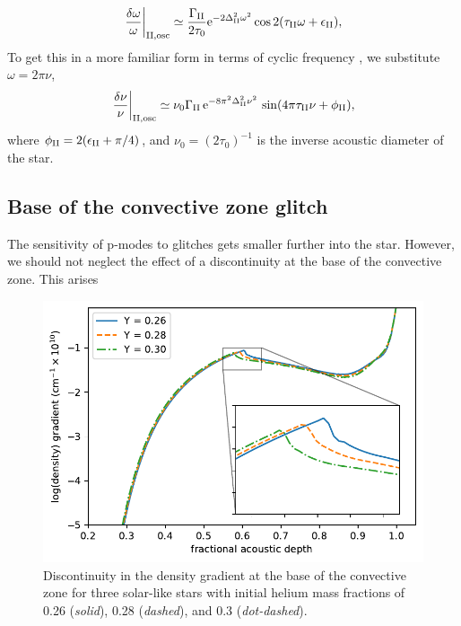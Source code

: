 %
\begin{equation}
    \left.\frac{\delta\omega}{\omega}\right|_{{\mathrm{II}}, \mathrm{osc}} \simeq \frac{\Gamma_{{\mathrm{II}}}}{2 \tau_0} \mathrm{e}^{- 2 \Delta_{{\mathrm{II}}}^2 \omega^2} \cos 2 (\tau_{{\mathrm{II}}}\omega + \epsilon_{{\mathrm{II}}}),
\end{equation}
%
To get this in a more familiar form in terms of cyclic frequency \citep[e.g.][]{Verma.Faria.ea2014,Verma.Raodeo.ea2017}, we substitute \(\omega = 2\pi\nu\),
%
\begin{equation}
    \left.\frac{\delta\nu}{\nu}\right|_{{\mathrm{II}}, \mathrm{osc}} \simeq \nu_0 \Gamma_{{\mathrm{II}}} \, \mathrm{e}^{- 8 \pi^2 \Delta_{{\mathrm{II}}}^2 \nu^2} \, \sin ( 4 \pi \tau_{{\mathrm{II}}} \nu + \phi_{{\mathrm{II}}}), \label{eq:he-osc}
\end{equation}
%
where \(\phi_{{\mathrm{II}}} = 2(\epsilon_{{\mathrm{II}}} + \pi/4)\), and \(\nu_0 = (2 \tau_0)^{-1}\) is the inverse acoustic diameter of the star.

\subsection{Base of the convective zone glitch}\label{sec:bcz-glitch}

The sensitivity of p-modes to glitches gets smaller further into the star. However, we should not neglect the effect of a discontinuity at the base of the convective zone. This arises 

\begin{figure}[!tb]
    \centering
    \includegraphics{figures/bcz-density-gradient.pdf}
    \caption{Discontinuity in the density gradient at the base of the convective zone for three solar-like stars with initial helium mass fractions of 0.26 (\emph{solid}), 0.28 (\emph{dashed}), and 0.3 (\emph{dot-dashed}).}
    \label{fig:bcz-density}
\end{figure}


